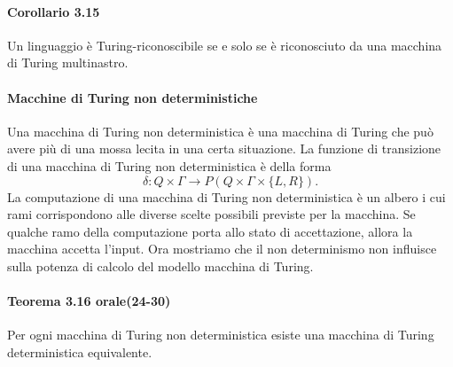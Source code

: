 \documentclass{article}
\begin{document}
\paragraph{Corollario 3.15}
\label{cor:da MdT multitape a single tape}
\text{ }

\begin{tcolorbox}[colback=blue!10!white, colframe=blue!50!black, title=Corollario 3.15]
    Un linguaggio è Turing-riconoscibile se e solo se è riconosciuto da una macchina di Turing multinastro.
\end{tcolorbox}

\paragraph{Macchine di Turing non deterministiche}
\label{def:non_deterministic_turing_machine}
\text{ }

Una macchina di Turing non deterministica è una macchina di Turing che può avere più di una mossa lecita in una certa situazione.
La funzione di transizione di una macchina di Turing non deterministica è della forma
$$
\delta: Q \times \Gamma \rightarrow P(Q \times \Gamma \times \{L,R\}).
$$
La computazione di una macchina di Turing non deterministica è un albero i cui rami corrispondono alle diverse scelte possibili previste per la macchina.
Se qualche ramo della computazione porta allo stato di accettazione, allora la macchina accetta l'input.
Ora mostriamo che il non determinismo non influisce sulla potenza di calcolo del modello macchina di Turing.

\paragraph{Teorema 3.16 orale(24-30)}
\label{teorema-3.16}
\text{ }

\begin{tcolorbox}[colback=blue!10!white, colframe=blue!50!black, title=Teorema 3.16 orale(24-30)]
    Per ogni macchina di Turing non deterministica esiste una macchina di Turing deterministica equivalente.
\end{tcolorbox}
\end{document}
